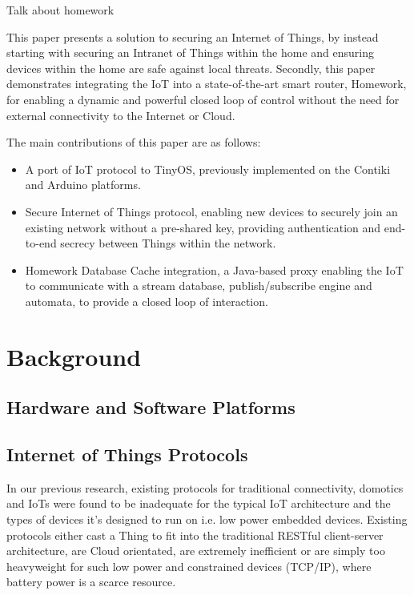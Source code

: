\documentclass[conference]{./sty/IEEEtran}
\begin{document}
Talk about homework

This paper presents a solution to securing an Internet of Things, by instead starting with securing an Intranet of Things within the home and ensuring devices within the home are safe against local threats. Secondly, this paper demonstrates integrating the IoT into a state-of-the-art smart router, Homework\cite{HomeworkProject}, for enabling a dynamic and powerful closed loop of control without the need for external connectivity to the Internet or Cloud. 

The main contributions of this paper are as follows:
\begin{itemize}
  \item A port of IoT protocol to TinyOS, previously implemented on the Contiki and Arduino platforms.
  \item Secure Internet of Things protocol, enabling new devices to securely join an existing network without a pre-shared key, providing authentication and end-to-end secrecy between Things within the network. 
  \item Homework Database Cache integration, a Java-based proxy enabling the IoT to communicate with a stream database, publish/subscribe engine and automata, to provide a closed loop of interaction.
\end{itemize}

\section{Background} %
\label{sec:background}

\subsection{Hardware and Software Platforms} %
\label{sec:hardware_and_software_platforms}

\subsection{Internet of Things Protocols} %
\label{sub:internet_of_things_protocols}
In our previous research\cite{KNoT}, existing protocols for traditional connectivity, domotics and IoTs were found to be inadequate for the typical IoT architecture and the types of devices it's designed to run on i.e. low power embedded devices. Existing protocols either cast a Thing to fit into the traditional RESTful client-server architecture\cite{IETF_COAP_HTTP}, are Cloud orientated\cite{SmartThings,Twine}, are extremely inefficient\cite{xAP} or are simply too heavyweight for such low power and constrained devices (TCP/IP), where battery power is a scarce resource. 
\end{document}
